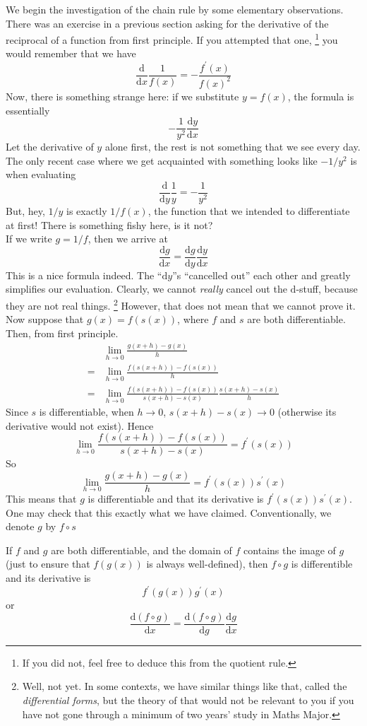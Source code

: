 We begin the investigation of the chain rule by some elementary observations.
There was an exercise in a previous section asking for the derivative of the reciprocal of a function from first principle.
If you attempted that one,
\footnote{If you did not, feel free to deduce this from the quotient rule.}
you would remember that we have
$$\frac{\mathrm d}{\mathrm dx}\frac{1}{f(x)}=-\frac{f^\prime(x)}{f(x)^2}$$
Now, there is something strange here: if we substitute $y=f(x)$, the formula is essentially
$$-\frac{1}{y^2}\frac{\mathrm dy}{\mathrm dx}$$
Let the derivative of $y$ alone first, the rest is not something that we see every day. The only recent case where we get acquainted with something looks like $-1/y^2$ is when evaluating
$$\frac{\mathrm d}{\mathrm dy}\frac{1}{y}=-\frac{1}{y^2}$$
But, hey, $1/y$ is exactly $1/f(x)$, the function that we intended to differentiate at first!
There is something fishy here, is it not?\\
If we write $g=1/f$, then we arrive at
$$\frac{\mathrm dg}{\mathrm dx}=\frac{\mathrm dg}{\mathrm dy}\frac{\mathrm dy}{\mathrm dx}$$
This is a nice formula indeed. The ``$\mathrm dy$''s ``cancelled out'' each other and greatly simplifies our evaluation.
Clearly, we cannot \textit{really} cancel out the $\mathrm d$-stuff, because they are not real things.
\footnote{Well, not yet. In some contexts, we have similar things like that, called the \textit{differential forms}, but the theory of that would not be relevant to you if you have not gone through a minimum of two years' study in Maths Major.}
However, that does not mean that we cannot prove it.\\
Now suppose that $g(x)=f(s(x))$, where $f$ and $s$ are both differentiable.
Then, from first principle.
\begin{align*}
    &\lim_{h\to0}\frac{g(x+h)-g(x)}{h}\\
    =&\lim_{h\to0}\frac{f(s(x+h))-f(s(x))}{h}\\
    =&\lim_{h\to0}\frac{f(s(x+h))-f(s(x))}{s(x+h)-s(x)}\frac{s(x+h)-s(x)}{h}
\end{align*}
Since $s$ is differentiable, when $h\to0$, $s(x+h)-s(x)\to0$ (otherwise its derivative would not exist). Hence
$$\lim_{h\to0}\frac{f(s(x+h))-f(s(x))}{s(x+h)-s(x)}=f^\prime(s(x))$$
So
$$\lim_{h\to0}\frac{g(x+h)-g(x)}{h}=f^\prime(s(x))s^\prime(x)$$
This means that $g$ is differentiable and that its derivative is $f^\prime(s(x))s^\prime(x)$.
One may check that this exactly what we have claimed.
Conventionally, we denote $g$ by $f\circ s$
\begin{theorem}
    If $f$ and $g$ are both differentiable, and the domain of $f$ contains the image of $g$ (just to ensure that $f(g(x))$ is always well-defined), then $f\circ g$ is differentible and its derivative is
    $$f^\prime(g(x))g^\prime(x)$$
    or
    $$\frac{\mathrm d(f\circ g)}{\mathrm dx}=\frac{\mathrm d(f\circ g)}{\mathrm dg}\frac{\mathrm dg}{\mathrm dx}$$
\end{theorem}
